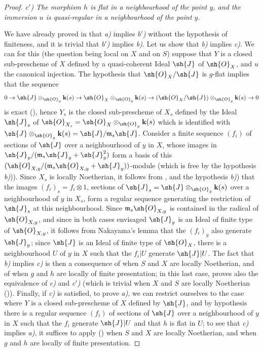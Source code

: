 \begin{proof}
\emph{c$'$) The morphism $h$ is flat in a neighbourhood of the point $y$, and the immersion $u$ is quasi-regular in a neighbourhood of the point $y$.}

We have already proved in  that \emph{a)} implies \emph{b$'$)} without the hypothesis of finiteness, and it is trivial that \emph{b$'$)} implies \emph{b)}.
Let us show that \emph{b)} implies \emph{c)}.
We can for this (the question being local on $X$ and on $S$) suppose that $Y$ is a closed sub-prescheme of $X$ defined by a quasi-coherent Ideal $\sh{J}$ of $\sh{O}_X$, and $u$ the canonical injection.
The hypothesis that $\sh{O}_X/\sh{J}$ is $g$-flat implies that the sequence
\[
  0\to\sh{J}\otimes_{\sh{O}_g}\mathbf{k}(s)\to\sh{O}_X\otimes_{\sh{O}_g}\mathbf{k}(s)\to(\sh{O}_X/\sh{J})\otimes_{\sh{O}_g}\mathbf{k}(s)\to 0
\]
is exact (), hence $Y_s$ is the closed sub-prescheme of $X_s$ defined by the Ideal $\sh{J}_s$ of $\sh{O}_{X_s}=\sh{O}_X\otimes_{\sh{O}_g}\mathbf{k}(s)$ which is identified with $\sh{J}\otimes_{\sh{O}_g}\mathbf{k}(s)=\sh{J}/\mathfrak{m}_s\sh{J}$.
Consider a finite sequence $(f_i)$ of sections of $\sh{J}$ over a neighbourhood of $y$ in $X$, whose images in $\sh{J}_y/(\mathfrak{m}_s\sh{J}_y+\sh{J}_y^2)$ form a basis of this $(\sh{O}_{X,y}/(\mathfrak{m}_s\sh{O}_{X,y}+\sh{J}_y))$-module (which is free by the hypothesis \emph{b)})).
Since $X_s$ is locally Noetherian, it follows from ,
 and the hypothesis \emph{b)}) that the images $(f_i)_s=f_i\otimes 1$, sections of $\sh{J}_s=\sh{J}\otimes_{\sh{O}_g}\mathbf{k}(s)$ over a neighbourhood of $y$ in $X_s$, form a regular sequence generating the restriction of $\sh{J}_s$ at this neighbourhood.
Since $\mathfrak{m}_s\sh{O}_{X,y}$ is contained in the radical of $\sh{O}_{X,y}$, and since in both cases envisaged $\sh{J}_y$ is an Ideal of finite type of $\sh{O}_{X,y}$, it follows from Nakayama's lemma that the $(f_i)_y$ also generate $\sh{J}_y$; since $\sh{J}$ is an Ideal of finite type of $\sh{O}_X$, there is a neighbourhood $U$ of $y$ in $X$ such that the $f_i|U$ generate $\sh{J}|U$.
The fact that \emph{b)} implies \emph{c)} is then a consequence of  when $S$ and $X$ are locally Noetherian, and of  when $g$ and $h$ are locally of finite presentation; in this last case,  proves also the equivalence of \emph{c)} and \emph{c$'$)} (which is trivial when $X$ and $S$ are locally Noetherian ()).
Finally, if \emph{c)} is satisfied, to prove \emph{a)}, we can restrict ourselves to the case where $Y$ is a closed sub-prescheme of $X$ defined by $\sh{J}$, and by hypothesis there is a regular sequence $(f_i)$ of sections of $\sh{J}$ over a neighbourhood of $y$ in $X$ such that the $f_i$ generate $\sh{J}|U$ and that $h$ is flat in $U$; to see that \emph{c)} implies \emph{a)}, it suffices to apply () when $S$ and $X$ are locally Noetherian, and  when $g$ and $h$ are locally of finite presentation.
\end{proof}

